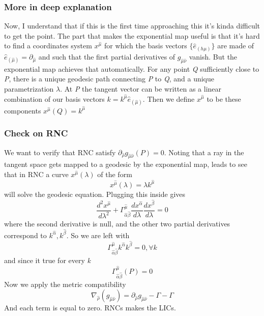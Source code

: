 \subsubsection{More in deep explanation}
Now, I understand that if this is the first time approaching this it's kinda difficult to get the point. 
The part that makes the exponential map useful is that it's hard to find a coordinates system $x^{\hat{\mu }}$ for which the basis vectors $\{ \hat{e}_{\left( h\mu  \right)}\}$ are made of $\hat{e}_{\left( \hat{\mu } \right)} = \partial_{\hat{\mu } }$ and such that the first partial derivatives of $g_{\hat{\mu }\hat{\nu }}$ vanish. But the exponential map achieves that automatically. For any point \emph{Q} sufficiently close to \emph{P}, there is a unique geodesic path connecting \emph{P} to \emph{Q}, and a unique parametrization $\lambda $. At \emph{P} the tangent vector can be written as a linear combination of our basis vectors $k = k^{\hat{\mu }} \hat{e}_{\left( \hat{\mu } \right)}$. Then we define $x^{\hat{\mu }}$ to be these components $x^{\hat{\mu }}\left( Q \right) = k^{\hat{\mu }}$

\subsubsection{Check on RNC}
We want to verify that RNC satisfy $\partial_{\hat{\rho }} g_{\hat{\mu }\hat{\nu }}\left( P \right) = 0$. Noting that a ray  in the tangent space gets mapped to a geodesic by the exponential map, leads to see that in RNC a curve $x^{\hat{\mu }}\left( \lambda  \right)$ of the form
\[
x^{\hat{\mu }} \left( \lambda  \right) = \lambda k^{\hat{\mu }}
\]
will solve the geodesic equation.  Plugging this inside gives
\begin{equation}
\frac{d ^{2} x^{\hat{\mu }}}{d \lambda ^{2}} + \Gamma ^{\hat{\mu }}_{\hat{\alpha }\hat{\beta }} \frac{d x^{\hat{\alpha }}}{d \lambda }\frac{d x^{\hat{\beta }}}{d \lambda } = 0
\end{equation}
where the second derivative is null, and the other two partial derivatives correspond to $k^{\hat{\alpha }}, k^{\hat{\beta }}$. So we are left with
\begin{equation}
\Gamma ^{\hat{\mu }}_{\hat{\alpha }\hat{\beta }} k^{\hat{\alpha }}k^{\hat{\beta }} = 0, \forall k
\end{equation}
and since it true for every \emph{k}
\[
\Gamma ^{\hat{\mu }}_{\hat{\alpha }\hat{\beta }} \left( P \right) = 0
\]
Now we apply the metric compatibility
\begin{equation}
\nabla _{\hat{\rho }} \left( g_{\hat{\mu }\hat{\nu }} \right) = \partial_{\hat{\rho }} g_{\hat{\mu }\hat{\nu }} - \Gamma - \Gamma 
\end{equation}
And each term is equal to zero. RNCs makes the LICs.


